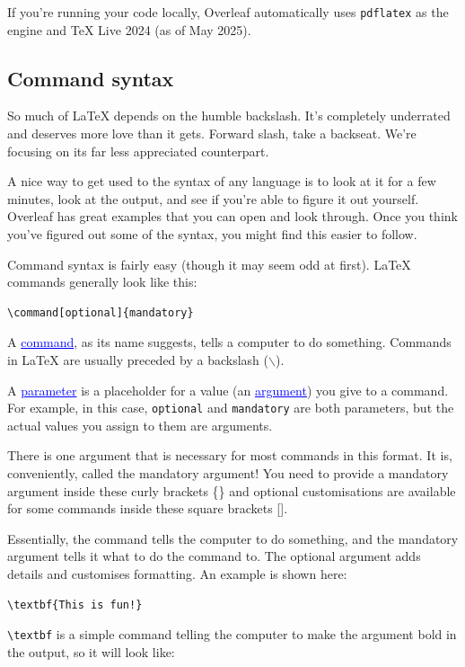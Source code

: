 \documentclass[letterpaper, 12pt]{article}
\newcommand{\define}[1]{\textcolor{blue}{\underline{#1}}} %
\newcommand{\cmd}[1]{\texttt{\textbackslash #1}} %
\begin{document}
If you're running your code locally, Overleaf automatically uses \texttt{pdflatex} as the engine and \TeX{} Live 2024 (as of May 2025). 

\subsection{Command syntax}
So much of \LaTeX{} depends on the humble backslash. It's completely underrated and deserves more love than it gets. Forward slash, take a backseat. We're focusing on its far less appreciated counterpart.

A nice way to get used to the syntax of any language is to look at it for a few minutes, look at the output, and see if you're able to figure it out yourself. Overleaf has great examples that you can open and look through. Once you think you've figured out some of the syntax, you might find this easier to follow.

Command syntax is fairly easy (though it may seem odd at first). \LaTeX{} commands generally look like this:

\begin{verbatim}
\command[optional]{mandatory}
\end{verbatim}
A \define{command}, as its name suggests, tells a computer to do something. Commands in \LaTeX{} are usually preceded by a backslash ($\backslash$).

A \define{parameter} is a placeholder for a value (an \define{argument}) you give to a command. For example, in this case, \texttt{optional} and \texttt{mandatory} are both parameters, but the actual values you assign to them are arguments.

There is one argument that is necessary for most commands in this format. It is, conveniently, called the mandatory argument! You need to provide a mandatory argument inside these curly brackets \{\} and optional customisations are available for some commands inside these square brackets [].

Essentially, the command tells the computer to do something, and the mandatory argument tells it what to do the command to. The optional argument adds details and customises formatting. An example is shown here:

\begin{verbatim}
\textbf{This is fun!}
\end{verbatim}
\cmd{textbf} is a simple command telling the computer to make the argument bold in the output, so it will look like:
\end{document}
